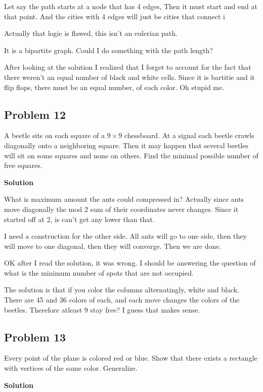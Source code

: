 \documentclass{article}
\begin{document}
Let say the path starts at a node that has 4 edges, Then it must start and end at that point.
And the cities with 4 edges will just be cities that connect i

Actually that logic is flawed, this isn't an eulerian path.

It is a bipartite graph. Could I do something with the path length?

After looking at the solution I realized that I forget to account for the 
fact that there weren't an equal number of black and white cells. Since it is 
bartitie and it flip flops, there must be an equal number, of each color. Oh stupid me.

\subsection{Problem 12}

A beetle sits on each square of a $9 \times 9$     chessboard. At a signal each beetle crawls
diagonally onto a neighboring square. Then it may happen that several beetles will
sit on some squares and none on others. Find the minimal possible number of free
squares.

\textbf{Solution}

What is maximum amount the ants could compressed in? Actually since ants 
move diagonally the mod 2 sum of their coordinates never changes. Since it 
started off at 2, is can't get any lower than that.

I need a construction for the other side. All ants will go to one side, then they will move 
to one diagonal, then they will converge. Then we are done.

OK after I read the solution, it was wrong. I should be answering the question 
of what is the minimum number of spots that are not occupied. 

The solution is that if you color the columns alternatingly, white and black. 
There are 45 and 36 colors of each, and each move changes the colors of the beetles.
Therefore atleast 9 stay free? I guess that makes sense.


\subsection{Problem 13}

Every point of the plane is colored red or blue. Show that there exists a rectangle
with vertices of the same color. Generalize.

\textbf{Solution}
\end{document}
